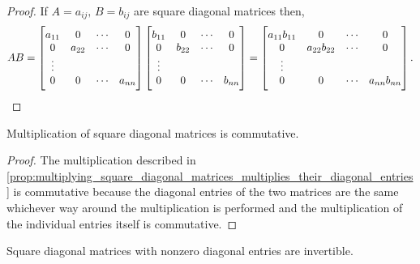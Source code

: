 \documentclass[../MathsNotesBase.tex]{subfiles}
\begin{document}
{		\medskip
		\begin{proof}
				If ${ A = a_{ij},\, B = b_{ij} }$ are square diagonal matrices then,
			\[  AB = 
				\begin{bmatrix}
				a_{11} & 0      & \cdots & 0\\
				0 	   & a_{22} & \cdots & 0\\
				\vdots\\
				0 	   & 0 	    & \cdots & a_{nn}
				\end{bmatrix}
				\begin{bmatrix}
				b_{11} & 0      & \cdots & 0\\
				0 	   & b_{22} & \cdots & 0\\
				\vdots\\
				0 	   & 0 	    & \cdots & b_{nn}
				\end{bmatrix} =
				\begin{bmatrix}
				a_{11}b_{11} & 0            & \cdots & 0\\
				0 	         & a_{22}b_{22} & \cdots & 0\\
				\vdots\\
				0 	         & 0 	        & \cdots & a_{nn}b_{nn}
				\end{bmatrix}. \qedhere
			\]
		\end{proof}
		\begin{corollary}
			\label{coro:multiplication_of_square_diagonal_matrices_is_commutative}
			Multiplication of square diagonal matrices is commutative.
		\end{corollary}
		\begin{proof}
			The multiplication described in \autoref{prop:multiplying_square_diagonal_matrices_multiplies_their_diagonal_entries} is commutative because the diagonal entries of the two matrices are the same whichever way around the multiplication is performed and the multiplication of the individual entries itself is commutative.
		\end{proof}
		\begin{corollary}
			\label{coro:square_diagonal_matrices_with_nonzero_diag_entries_invertible}
			Square diagonal matrices with nonzero diagonal entries are invertible.

\end{corollary}}
\end{document}
